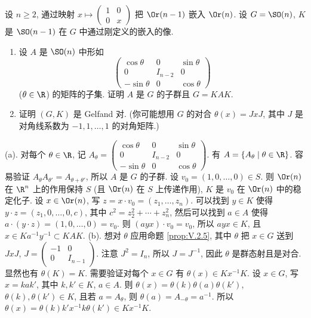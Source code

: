 \begin{exercise}[$(\SO(n), \SO(n-1))$ 是 Gelfand 对]
\label{ex:V.8.1.3}
设 $n \geq 2$, 通过映射 $x \longmapsto \begin{pmatrix} 1 & 0 \\ 0 & x \end{pmatrix}$ 把 $\Or(n-1)$ 嵌入 $\Or(n)$. 设 $G = \SO(n)$, $K$ 是 $\SO(n-1)$ 在 $G$ 中通过刚定义的嵌入的像.
\begin{enumerate}
\item[(a)] 设 $A$ 是 $\SO(n)$ 中形如
\[
\begin{pmatrix} \cos\theta & 0 & \sin\theta \\ 0 & I_{n-2} & 0 \\ -\sin\theta & 0 & \cos\theta \end{pmatrix}
\]
($\theta \in \R$) 的矩阵的子集.
证明 $A$ 是 $G$ 的子群且 $G = KAK$.
\item[(b)] 证明 $(G, K)$ 是 Gelfand 对. (你可能想用 $G$ 的对合 $\theta(x) = JxJ$, 其中 $J$ 是对角线系数为 $-1, 1, \ldots, 1$ 的对角矩阵.)
\end{enumerate}
\end{exercise}

\begin{solution}
(a). 对每个 $\theta \in \R$, 记 $A_{\theta} = \begin{pmatrix} \cos\theta & 0 & \sin\theta \\ 0 & I_{n-2} & 0 \\ -\sin\theta & 0 & \cos\theta \end{pmatrix}$. 有 $A = \{A_{\theta} \mid \theta \in \R\}$. 容易验证 $A_{\theta}A_{\theta'} = A_{\theta + \theta'}$, 所以 $A$ 是 $G$ 的子群.
设 $v_0 = (1, 0, \ldots, 0) \in S$. 则 $\Or(n)$ 在 $\R^n$ 上的作用保持 $S$ (且 $\Or(n)$ 在 $S$ 上传递作用), $K$ 是 $v_0$ 在 $\Or(n)$ 中的稳定化子. 设 $x \in \Or(n)$, 写 $z = x \cdot v_0 = (z_1, \ldots, z_n)$. 可以找到 $y \in K$ 使得 $y \cdot z = (z_1, 0, \ldots, 0, c)$, 其中 $c^2 = z_2^2 + \cdots + z_n^2$, 然后可以找到 $a \in A$ 使得 $a \cdot (y \cdot z) = (1, 0, \ldots, 0) = v_0$. 则 $(ayx) \cdot v_0 = v_0$, 所以 $ayx \in K$, 且 $x \in Ka^{-1}y^{-1} \subset KAK$.
(b). 想对 $\theta$ 应用命题 \ref{prop:V.2.5}, 其中 $\theta$ 把 $x \in G$ 送到 $JxJ$, $J = \begin{pmatrix} -1 & 0 \\ 0 & I_{n-1} \end{pmatrix}$. 注意 $J^2 = I_n$, 所以 $J = J^{-1}$, 因此 $\theta$ 是群态射且是对合. 显然也有 $\theta(K) = K$. 需要验证对每个 $x \in G$ 有 $\theta(x) \in Kx^{-1}K$. 设 $x \in G$, 写 $x = kak'$, 其中 $k, k' \in K$, $a \in A$. 则 $\theta(x) = \theta(k)\theta(a)\theta(k')$, $\theta(k), \theta(k') \in K$, 且若 $a = A_{\theta}$, 则 $\theta(a) = A_{-\theta} = a^{-1}$. 所以 $\theta(x) = \theta(k)k'x^{-1}k\theta(k') \in Kx^{-1}K$.
\end{solution}

